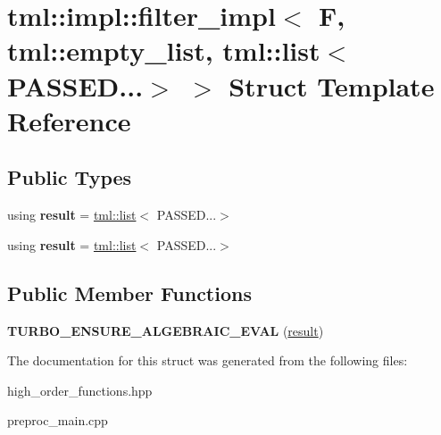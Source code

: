 \hypertarget{structtml_1_1impl_1_1filter__impl_3_01F_00_01tml_1_1empty__list_00_01tml_1_1list_3_01PASSED_8_8_8_4_01_4}{\section{tml\+:\+:impl\+:\+:filter\+\_\+impl$<$ F, tml\+:\+:empty\+\_\+list, tml\+:\+:list$<$ P\+A\+S\+S\+E\+D...$>$ $>$ Struct Template Reference}
\label{structtml_1_1impl_1_1filter__impl_3_01F_00_01tml_1_1empty__list_00_01tml_1_1list_3_01PASSED_8_8_8_4_01_4}
}
\subsection*{Public Types}
\begin{DoxyCompactItemize}
\item 
\hypertarget{structtml_1_1impl_1_1filter__impl_3_01F_00_01tml_1_1empty__list_00_01tml_1_1list_3_01PASSED_8_8_8_4_01_4_a9fe48a1869a8f6b3ced03f4c0140f7e9}{using {\bfseries result} = \hyperlink{structtml_1_1list}{tml\+::list}$<$ P\+A\+S\+S\+E\+D...$>$}\label{structtml_1_1impl_1_1filter__impl_3_01F_00_01tml_1_1empty__list_00_01tml_1_1list_3_01PASSED_8_8_8_4_01_4_a9fe48a1869a8f6b3ced03f4c0140f7e9}

\item 
\hypertarget{structtml_1_1impl_1_1filter__impl_3_01F_00_01tml_1_1empty__list_00_01tml_1_1list_3_01PASSED_8_8_8_4_01_4_a9fe48a1869a8f6b3ced03f4c0140f7e9}{using {\bfseries result} = \hyperlink{structtml_1_1list}{tml\+::list}$<$ P\+A\+S\+S\+E\+D...$>$}\label{structtml_1_1impl_1_1filter__impl_3_01F_00_01tml_1_1empty__list_00_01tml_1_1list_3_01PASSED_8_8_8_4_01_4_a9fe48a1869a8f6b3ced03f4c0140f7e9}

\end{DoxyCompactItemize}
\subsection*{Public Member Functions}
\begin{DoxyCompactItemize}
\item 
\hypertarget{structtml_1_1impl_1_1filter__impl_3_01F_00_01tml_1_1empty__list_00_01tml_1_1list_3_01PASSED_8_8_8_4_01_4_a3954a7f5aaad76bb83fc2ea77401a287}{{\bfseries T\+U\+R\+B\+O\+\_\+\+E\+N\+S\+U\+R\+E\+\_\+\+A\+L\+G\+E\+B\+R\+A\+I\+C\+\_\+\+E\+V\+A\+L} (\hyperlink{structtml_1_1list}{result})}\label{structtml_1_1impl_1_1filter__impl_3_01F_00_01tml_1_1empty__list_00_01tml_1_1list_3_01PASSED_8_8_8_4_01_4_a3954a7f5aaad76bb83fc2ea77401a287}

\end{DoxyCompactItemize}


The documentation for this struct was generated from the following files\+:\begin{DoxyCompactItemize}
\item 
high\+\_\+order\+\_\+functions.\+hpp\item 
preproc\+\_\+main.\+cpp\end{DoxyCompactItemize}
